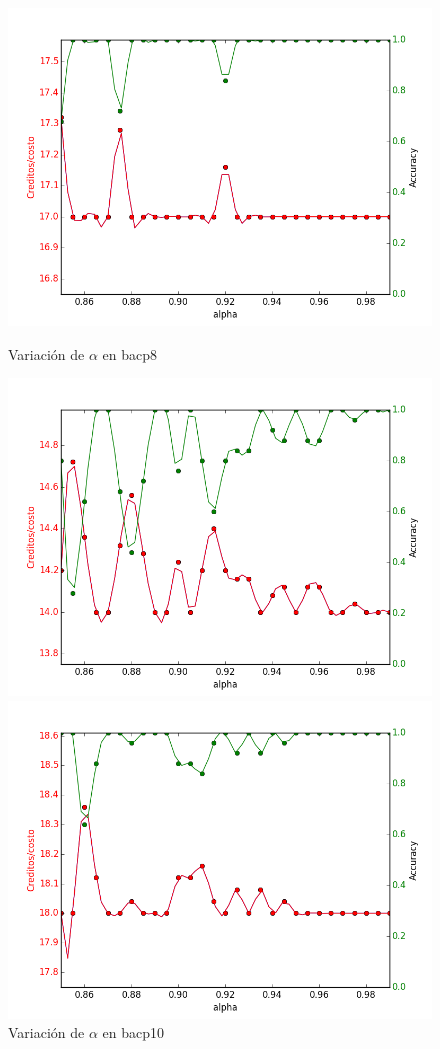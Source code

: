 \documentclass[letterpaper,10pt]{article}
\begin{document}
\begin{figure}[H]
        \includegraphics[width=\linewidth]{img/1-alpha-bacp8.png}
        \caption{Variación de $\alpha$ en bacp8}
        \label{fig:alpha1}
    \endminipage\hfill
        \includegraphics[width=\linewidth]{img/1-alpha-bacp10.png}
        \caption{Variación de $\alpha$ en bacp10}
        \label{fig:alpha2}
    \endminipage\hfill
    \includegraphics[width=\linewidth]{img/1-alpha-bacp12.png}

\end{figure}
\end{document}
